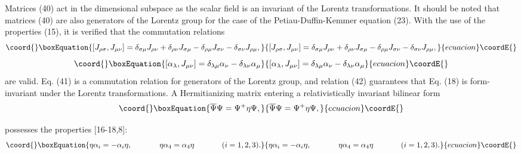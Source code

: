 \documentclass[a4paper,12pt]{article}
\begin{document}
Matrices (40) act in the \coordHE{}dimensional subspace \coordHE{} as the scalar field \coordHE{} is an invariant of the Lorentz transformations. It
should be noted that matrices (40) are also generators of the
Lorentz group for the case of the Petiau-Duffin-Kemmer equation
(23). With the use of the properties (15), it is verified that the
commutation relations
\begin{equation}\coord{}\boxEquation{
\left[ J_{\rho \sigma },J_{\mu \nu }\right] =\delta _{\sigma \mu
}J_{\rho \nu }+\delta _{\rho \nu }J_{\sigma \mu }-\delta _{\rho
\mu }J_{\sigma \nu }-\delta _{\sigma \nu }J_{\rho \mu },
\label{41}
}{
\left[ J_{\rho \sigma },J_{\mu \nu }\right] =\delta _{\sigma \mu
}J_{\rho \nu }+\delta _{\rho \nu }J_{\sigma \mu }-\delta _{\rho
\mu }J_{\sigma \nu }-\delta _{\sigma \nu }J_{\rho \mu },
}{ecuacion}\coordE{}\end{equation}
\begin{equation}\coord{}\boxEquation{
\left[ \alpha _\lambda ,J_{\mu \nu }\right] =\delta _{\lambda \mu
}\alpha _\nu -\delta _{\lambda \nu }\alpha _\mu  \label{42}
}{
\left[ \alpha _\lambda ,J_{\mu \nu }\right] =\delta _{\lambda \mu
}\alpha _\nu -\delta _{\lambda \nu }\alpha _\mu  }{ecuacion}\coordE{}\end{equation}
are valid.  Eq. (41) is a commutation relation for generators of
the Lorentz group, and relation (42) guarantees that Eq. (18) is
form-invariant under the Lorentz transformations. A Hermitianizing
matrix \myHighlight{$\eta $}\coordHE{} entering a relativistically invariant bilinear form
\begin{equation}\coord{}\boxEquation{
\overline{\Psi }\Psi =\Psi ^{+}\eta \Psi,  \label{43}
}{
\overline{\Psi }\Psi =\Psi ^{+}\eta \Psi,  }{ecuacion}\coordE{}\end{equation}

possesses the properties [16-18,8]:
\begin{equation}\coord{}\boxEquation{
\eta \alpha _i=-\alpha _i\eta ,\hspace{0.5in}\eta \alpha _4=\alpha
_4\eta \hspace{0.5in}(i=1,2,3).  \label{44}
}{
\eta \alpha _i=-\alpha _i\eta ,\hspace{0.5in}\eta \alpha _4=\alpha
_4\eta \hspace{0.5in}(i=1,2,3).  }{ecuacion}\coordE{}\end{equation}
\end{document}
